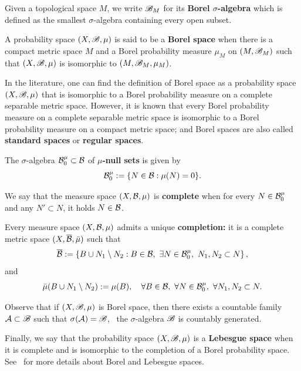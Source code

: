 Given a topological space $M$, we write $\mathscr{B}_{M}$ for its \textbf{Borel $\sigma$-algebra} which is defined as the smallest $\sigma$-algebra containing every open subset.

A probability space $(X,\mathscr{B},\mu)$ is said to be a \textbf{Borel space} when there is a compact metric space $M$ and a Borel probability measure $\mu_{M}$ on $(M,\mathscr{B}_{M})$ such that $(X,\mathscr{B},\mu)$ is isomorphic to $(M,\mathscr{B}_{M},\mu_{M})$.

In the literature, one can find the definition of Borel space as a probability space $(X,\mathscr{B},\mu)$ that is isomorphic to a Borel probability measure on a complete separable metric space. However, it is known that every Borel probability measure on a complete separable metric space is isomorphic to a Borel probability measure on a compact metric space; and Borel spaces are also called \textbf{standard spaces} or \textbf{regular spaces}.

The $\sigma$-algebra $\mathcal{B}_{0}^{\mu}\subset\mathcal{B}$ of \textbf{$\mu$-null sets} is given by
\begin{displaymath}
  \mathcal{B}_{0}^{\mu}:=\{N\in\mathcal{B} : \mu(N)=0\}.
\end{displaymath}

We say that the measure space $(X,\mathcal{B},\mu)$ is \textbf{complete} when for every $N\in\mathcal{B}_{0}^{\mu}$ and any $N'\subset N$, it holds $N\in\mathcal{B}$.

Every measure space $(X,\mathcal{B},\mu)$ admits a unique \textbf{completion:} it is a complete metric space $(X,\overline{\mathcal{B}},\bar\mu)$ such that
\begin{displaymath}
  \overline{\mc{B}}:=\left\{B\cup N_{1}\setminus N_{2} : B\in\mc{B},\ \exists N\in\mc{B}_{0}^{\mu},\ N_{1},N_{2}\subset N\right\},
\end{displaymath}
and
\begin{displaymath}
  \bar{\mu}(B\cup N_{1}\setminus N_{2}):=\mu(B), \quad\forall B\in\mathcal{B},\ \forall N\in\mathcal{B}_{0}^{\mu},\ \forall N_{1},N_{2}\subset N.
\end{displaymath}



Observe that if $(X,\mathscr{B},\mu)$ is Borel space, then there exists a countable family $\mathcal{A}\subset\mathscr{B}$ such that $\sigma(\mathcal{A})=\mathscr{B}$, \ie~the $\sigma$-algebra $\mathscr{B}$ is countably generated.

Finally, we say that the probability space $(X,\mathscr{B},\mu)$ is a \textbf{Lebesgue space} when it is complete and is isomorphic to the completion of a Borel probability space. See~\cite[Appendix A. 6]{EinsiedlerWardErgThViewNumbTh} for more details about Borel and Lebesgue spaces.




